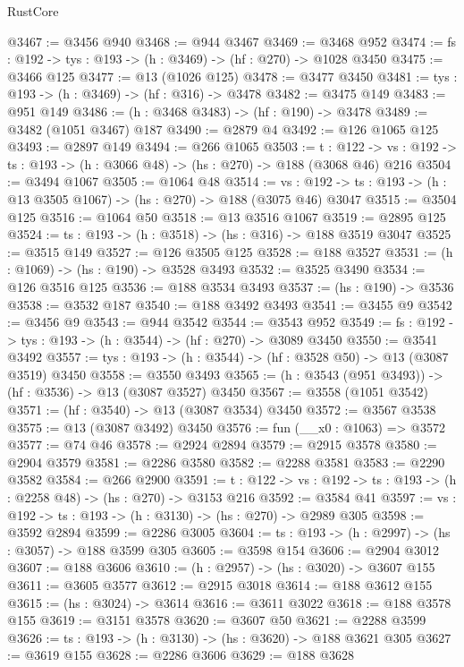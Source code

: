 \begin{lexlean}{RustCore}
\begin{coremodule}
@3467 := @3456 @940
@3468 := @944 @3467
@3469 := @3468 @952
@3474 := {fs : @192} -> {tys : @193} -> (h : @3469) -> (hf : @270) -> @1028 @3450
@3475 := @3466 @125
@3477 := @13 (@1026 @125)
@3478 := @3477 @3450
@3481 := {tys : @193} -> (h : @3469) -> (hf : @316) -> @3478
@3482 := @3475 @149
@3483 := @951 @149
@3486 := (h : @3468 @3483) -> (hf : @190) -> @3478
@3489 := @3482 (@1051 @3467) @187
@3490 := @2879 @4
@3492 := @126 @1065 @125
@3493 := @2897 @149
@3494 := @266 @1065
@3503 := {t : @122} ->
  {vs : @192} -> {ts : @193} -> (h : @3066 @48) -> (hs : @270) -> @188 (@3068 @46) @216
@3504 := @3494 @1067
@3505 := @1064 @48
@3514 := {vs : @192} ->
  {ts : @193} -> (h : @13 @3505 @1067) -> (hs : @270) -> @188 (@3075 @46) @3047
@3515 := @3504 @125
@3516 := @1064 @50
@3518 := @13 @3516 @1067
@3519 := @2895 @125
@3524 := {ts : @193} -> (h : @3518) -> (hs : @316) -> @188 @3519 @3047
@3525 := @3515 @149
@3527 := @126 @3505 @125
@3528 := @188 @3527
@3531 := (h : @1069) -> (hs : @190) -> @3528 @3493
@3532 := @3525 @3490
@3534 := @126 @3516 @125
@3536 := @188 @3534 @3493
@3537 := (hs : @190) -> @3536
@3538 := @3532 @187
@3540 := @188 @3492 @3493
@3541 := @3455 @9
@3542 := @3456 @9
@3543 := @944 @3542
@3544 := @3543 @952
@3549 := {fs : @192} -> {tys : @193} -> (h : @3544) -> (hf : @270) -> @3089 @3450
@3550 := @3541 @3492
@3557 := {tys : @193} -> (h : @3544) -> (hf : @3528 @50) -> @13 (@3087 @3519) @3450
@3558 := @3550 @3493
@3565 := (h : @3543 (@951 @3493)) -> (hf : @3536) -> @13 (@3087 @3527) @3450
@3567 := @3558 (@1051 @3542)
@3571 := (hf : @3540) -> @13 (@3087 @3534) @3450
@3572 := @3567 @3538
@3575 := @13 (@3087 @3492) @3450
@3576 := fun (__x0 : @1063) => @3572
@3577 := @74 @46
@3578 := @2924 @2894
@3579 := @2915 @3578
@3580 := @2904 @3579
@3581 := @2286 @3580
@3582 := @2288 @3581
@3583 := @2290 @3582
@3584 := @266 @2900
@3591 := {t : @122} -> {vs : @192} -> {ts : @193} -> (h : @2258 @48) -> (hs : @270) -> @3153 @216
@3592 := @3584 @41
@3597 := {vs : @192} -> {ts : @193} -> (h : @3130) -> (hs : @270) -> @2989 @305
@3598 := @3592 @2894
@3599 := @2286 @3005
@3604 := {ts : @193} -> (h : @2997) -> (hs : @3057) -> @188 @3599 @305
@3605 := @3598 @154
@3606 := @2904 @3012
@3607 := @188 @3606
@3610 := (h : @2957) -> (hs : @3020) -> @3607 @155
@3611 := @3605 @3577
@3612 := @2915 @3018
@3614 := @188 @3612 @155
@3615 := (hs : @3024) -> @3614
@3616 := @3611 @3022
@3618 := @188 @3578 @155
@3619 := @3151 @3578
@3620 := @3607 @50
@3621 := @2288 @3599
@3626 := {ts : @193} -> (h : @3130) -> (hs : @3620) -> @188 @3621 @305
@3627 := @3619 @155
@3628 := @2286 @3606
@3629 := @188 @3628

\end{coremodule}
\end{lexlean}
